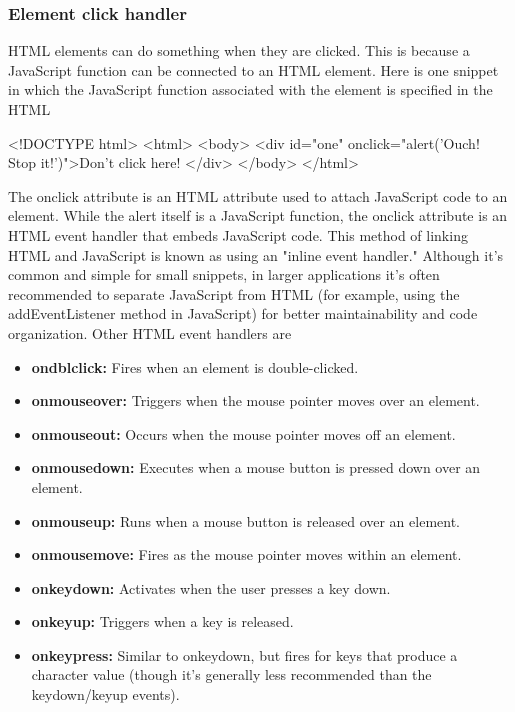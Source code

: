 \documentclass{report}
\begin{document}
\begin{jscode}
\subsubsection{Element click handler}
\bigbreak \noindent 
HTML elements can do something when they are clicked. This is because a
JavaScript function can be connected to an HTML element. Here is one snippet in
which the JavaScript function associated with the element is specified in the HTML
\bigbreak \noindent 
\begin{jscode}
    <!DOCTYPE html>
    <html>
        <body>
            <div id="one" onclick="alert('Ouch! Stop it!')">Don't click here! </div>
        </body>
    </html>
\end{jscode}
\bigbreak \noindent 
The onclick attribute is an HTML attribute used to attach JavaScript code to an element.  While the alert itself is a JavaScript function, the onclick attribute is an HTML event handler that embeds JavaScript code.
\bigbreak \noindent 
This method of linking HTML and JavaScript is known as using an "inline event handler." Although it's common and simple for small snippets, in larger applications it’s often recommended to separate JavaScript from HTML (for example, using the addEventListener method in JavaScript) for better maintainability and code organization.
\bigbreak \noindent 
Other HTML event handlers are
\begin{itemize}
    \item \textbf{ondblclick:} Fires when an element is double-clicked.
    \item \textbf{onmouseover:} Triggers when the mouse pointer moves over an element.
    \item \textbf{onmouseout:} Occurs when the mouse pointer moves off an element.
    \item \textbf{onmousedown:} Executes when a mouse button is pressed down over an element.
    \item \textbf{onmouseup:} Runs when a mouse button is released over an element.
    \item \textbf{onmousemove:} Fires as the mouse pointer moves within an element.
    \item \textbf{onkeydown:} Activates when the user presses a key down.
    \item \textbf{onkeyup:} Triggers when a key is released.
    \item \textbf{onkeypress:} Similar to onkeydown, but fires for keys that produce a character value (though it’s generally less recommended than the keydown/keyup events).

\end{itemize}
\end{jscode}
\end{document}
